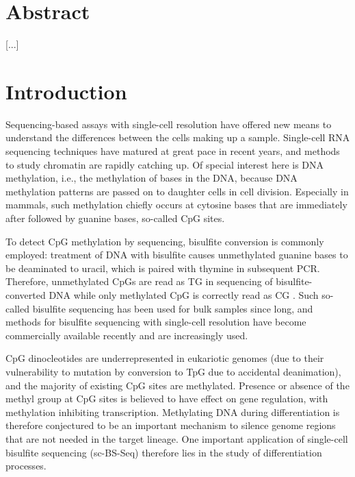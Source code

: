 \documentclass[twocolumn,10pt]{article}
\begin{document}
\setcounter{secnumdepth}{0}


\section{Abstract}

[...]

\section{Introduction}

Sequencing-based assays with single-cell resolution have offered new means to understand the differences between the cells making up a sample. Single-cell RNA sequencing techniques have matured at great pace in recent years, and methods to study chromatin are rapidly catching up. Of special interest here is DNA methylation, i.e., the methylation of bases in the DNA, because DNA methylation patterns are passed on to daughter cells in cell division. Especially in mammals, such methylation chiefly occurs at cytosine bases that are immediately after followed by guanine bases, so-called CpG sites. 

To detect CpG methylation by sequencing, bisulfite conversion is commonly employed: treatment of DNA with bisulfite causes unmethylated guanine bases to be deaminated to uracil, which is paired with thymine in subsequent PCR. Therefore, unmethylated CpGs are read as TG in sequencing of bisulfite-converted DNA while only methylated CpG is correctly read as CG \citep{Frommer_1992}. Such so-called bisulfite sequencing has been used for bulk samples since long, and methods for bisulfite sequencing with single-cell resolution \citep{Smallwood_2014} have become commercially available recently and are increasingly used.

CpG dinocleotides are underrepresented in eukariotic genomes (due to their vulnerability to mutation by conversion to TpG due to accidental deanimation), and the majority of existing CpG sites are methylated. Presence or absence of the methyl group at CpG sites is believed to have effect on gene regulation, with methylation inhibiting transcription. Methylating DNA during differentiation is therefore conjectured to be an important mechanism to silence genome regions that are not needed in the target lineage. One important application of single-cell bisulfite sequencing (sc-BS-Seq) therefore lies in the study of differentiation processes.
\end{document}
